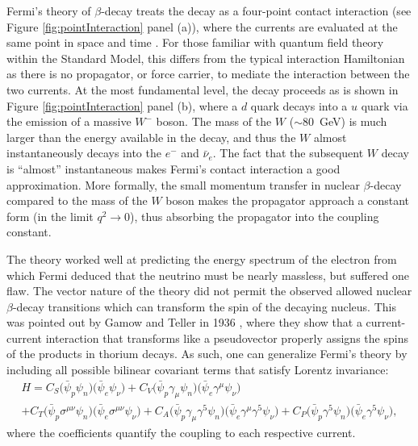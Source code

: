 Fermi's theory of $\beta$-decay treats the decay as a four-point contact interaction
(see Figure \ref{fig:pointInteraction} panel (a)), where
the currents are evaluated at the same point in space and time \cite{renton1990}. For those
familiar with quantum field theory within the Standard Model, this differs from the typical
interaction Hamiltonian as there is no propagator, or force carrier, to mediate the
interaction between the two currents. At the most fundamental level, the decay proceeds as is shown
in Figure \ref{fig:pointInteraction} panel (b), where a $d$ quark decays into a $u$ quark
via the emission of a massive $W^-$ boson. The mass of the $W$ ($\sim 80$~GeV) is much larger than
the energy available in the decay, and thus the $W$ almost instantaneously decays into
the $e^-$ and $\bar{\nu}_e$. The fact that the subsequent $W$ decay is ``almost'' instantaneous
makes Fermi's contact interaction a good approximation. More formally, the small momentum transfer in nuclear
$\beta$-decay compared to the mass of the $W$ boson makes the propagator approach a constant form
(in the limit $q^2\rightarrow 0$), thus absorbing
the propagator into the coupling constant.

The theory
worked well at predicting the energy spectrum of the electron from which
Fermi deduced that the neutrino must be nearly massless, but suffered one flaw. The vector
nature of the theory did not permit the observed allowed nuclear $\beta$-decay transitions
which can transform the spin of the decaying nucleus. This was pointed out by Gamow and Teller in
1936 \cite{gamow1936}, where they show that a current-current interaction that transforms like
a pseudovector properly assigns the spins of the products in thorium decays. As such,
one can generalize Fermi's theory by including all possible bilinear covariant terms that
satisfy Lorentz invariance:
%
\begin{multline}
  H = C_S\big( \bar{\psi}_p \psi_n \big) \big( \bar{\psi}_e  \psi_\nu \big) 
  +C_V\big( \bar{\psi}_p \gamma_\mu \psi_n \big) \big( \bar{\psi}_e \gamma^\mu \psi_\nu \big) \\
  +C_T\big( \bar{\psi}_p \sigma^{\mu\nu} \psi_n \big) \big( \bar{\psi}_e \sigma^{\mu\nu} \psi_\nu \big) 
  +C_A\big( \bar{\psi}_p \gamma_\mu \gamma^5 \psi_n \big) \big( \bar{\psi}_e \gamma^\mu \gamma^5 \psi_\nu \big) 
  +C_P\big( \bar{\psi}_p  \gamma^5 \psi_n \big) \big( \bar{\psi}_e  \gamma^5 \psi_\nu \big),
  \label{eq:FermiFull}
\end{multline}
%
where the coefficients quantify the coupling to each respective current.

